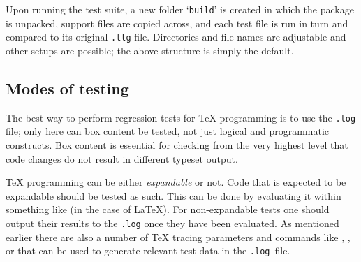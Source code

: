 \documentclass[final]{ltugboat}
\begin{document}
Upon
running the test suite, a new folder `\texttt{build}' is created in
which the package is unpacked, support files are copied across, and
each test file is run in turn and compared to its original
\texttt{.tlg} file. Directories and file names are adjustable and
other setups are possible; the above structure is simply the default.


\subsection{Modes of testing}

The best way to perform regression tests for \TeX{} programming is to
use the \texttt{.log} file; only here
can box content be tested, not just logical and
programmatic constructs.  Box
content is essential for checking from the very highest level that
code changes do not result in different typeset output.

\TeX{} programming can be either \emph{expandable} or not.
Code that is expected to be
expandable should be tested as such.  This can be done by evaluating it within something like  (in the case of \LaTeX). For non-expandable tests one should output
their results to the \texttt{.log} once they have been evaluated.
%
As mentioned earlier there are also a number of \TeX{} tracing parameters
and commands like , , or  that
can be used to generate relevant test data in the \texttt{.log}~file.
\end{document}
